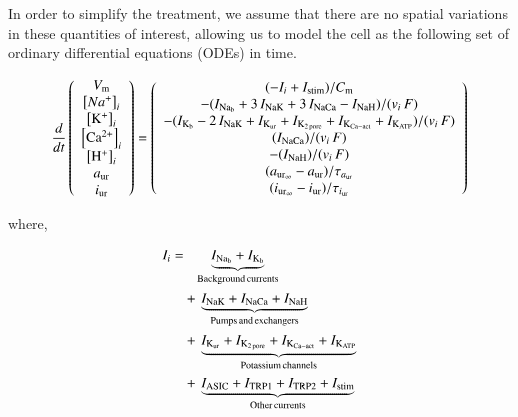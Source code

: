 In order to simplify the treatment, we assume that there are no
spatial variations in these quantities of interest, allowing us to
model the cell as the following set of ordinary differential equations
(ODEs) in time.

\begin{equation}
  \frac{d}{dt}
  \left(
    \begin{array}{c}
      V_{\rm m}\\
      \left[Na^{+}\right]_{i}\\
      \left[\rm K^{+}\right]_{i}\\
      \left[\rm Ca^{2+}\right]_{i}\\
      \left[\rm H^{+}\right]_{i}\\
      a_{\rm ur}\\
      i_{\rm ur}\\
    \end{array}
  \right)  = \left(
    \begin{array}{c}
        (-I_{i} + I_{\rm stim})/{C_{\rm m}}\\
      - (I_{\rm Na_{b}} + 3\, I_{\rm NaK} + 3\, I_{\rm NaCa} - I_{\rm
        NaH})/(v_{i}\, F)\\
      - (I_{\rm K_{b}} - 2\, I_{\rm NaK} + I_{\rm K_{ur}} + I_{\rm
        K_{2\, pore}} + I_{\rm K_{Ca-act}} + I_{\rm K_{ATP}})/(v_{i}\,
      F)\\
        (I_{\rm NaCa})/(v_{i}\, F)\\
      - (I_{\rm NaH})/(v_{i}\, F)\\
      (a_{{\rm ur}_{\infty}} - a_{\rm ur})/\tau_{a_{\rm ur}}\\
      (i_{{\rm ur}_{\infty}} - i_{\rm ur})/\tau_{i_{\rm ur}}\\
    \end{array}
  \right)
\end{equation}

\noindent where,

\begin{displaymath}
    \begin{split}
      I_{i} =
      & \phantom{+\,} \underbrace{I_{\rm Na_b} + I_{\rm K_b}}_{\rm
        Background\, currents}\\
      & +\, \underbrace{I_{\rm NaK} + I_{\rm NaCa} + I_{\rm NaH}}_{\rm
        Pumps\, and\, exchangers}\\
      & +\, \underbrace{I_{\rm K_{ur}} + I_{\rm K_{2\, pore}} + I_{\rm
          K_{Ca-act}} + I_{\rm K_{ATP}}}_{\rm Potassium\, channels}\\
      & +\, \underbrace{I_{\rm ASIC} + I_{\rm TRP1} + I_{\rm TRP2} +
        I_{\rm stim}}_{\rm Other\, currents}
    \end{split}
\end{displaymath}

